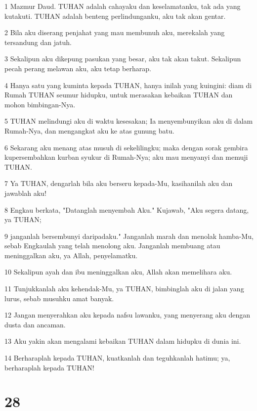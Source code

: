 \par 1 Mazmur Daud. TUHAN adalah cahayaku dan keselamatanku, tak ada yang kutakuti. TUHAN adalah benteng perlindunganku, aku tak akan gentar.
\par 2 Bila aku diserang penjahat yang mau membunuh aku, merekalah yang tersandung dan jatuh.
\par 3 Sekalipun aku dikepung pasukan yang besar, aku tak akan takut. Sekalipun pecah perang melawan aku, aku tetap berharap.
\par 4 Hanya satu yang kuminta kepada TUHAN, hanya inilah yang kuingini: diam di Rumah TUHAN seumur hidupku, untuk merasakan kebaikan TUHAN dan mohon bimbingan-Nya.
\par 5 TUHAN melindungi aku di waktu kesesakan; Ia menyembunyikan aku di dalam Rumah-Nya, dan mengangkat aku ke atas gunung batu.
\par 6 Sekarang aku menang atas musuh di sekelilingku; maka dengan sorak gembira kupersembahkan kurban syukur di Rumah-Nya; aku mau menyanyi dan memuji TUHAN.
\par 7 Ya TUHAN, dengarlah bila aku berseru kepada-Mu, kasihanilah aku dan jawablah aku!
\par 8 Engkau berkata, "Datanglah menyembah Aku." Kujawab, "Aku segera datang, ya TUHAN;
\par 9 janganlah bersembunyi daripadaku." Janganlah marah dan menolak hamba-Mu, sebab Engkaulah yang telah menolong aku. Janganlah membuang atau meninggalkan aku, ya Allah, penyelamatku.
\par 10 Sekalipun ayah dan ibu meninggalkan aku, Allah akan memelihara aku.
\par 11 Tunjukkanlah aku kehendak-Mu, ya TUHAN, bimbinglah aku di jalan yang lurus, sebab musuhku amat banyak.
\par 12 Jangan menyerahkan aku kepada nafsu lawanku, yang menyerang aku dengan dusta dan ancaman.
\par 13 Aku yakin akan mengalami kebaikan TUHAN dalam hidupku di dunia ini.
\par 14 Berharaplah kepada TUHAN, kuatkanlah dan teguhkanlah hatimu; ya, berharaplah kepada TUHAN!

\chapter{28}

